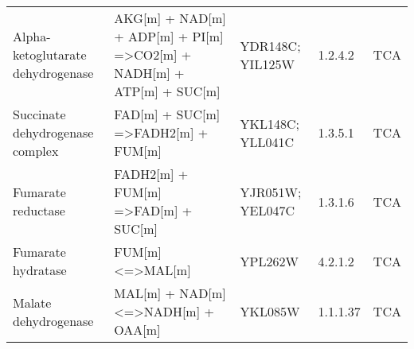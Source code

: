 {\begin{landscape}
\begin{longtable}{p{.25\linewidth} | p{.40\linewidth} | p{.19\linewidth} | p{.05\linewidth} | p{.10\linewidth}}
Alpha-ketoglutarate dehydrogenase                                                         & AKG{[}m{]} + NAD{[}m{]} + ADP{[}m{]} + PI{[}m{]} =\textgreater CO2{[}m{]} + NADH{[}m{]} + ATP{[}m{]} + SUC{[}m{]}                               & YDR148C; YIL125W                                                                                                                                                 & 1.2.4.2            & TCA                                                                         \\
Succinate dehydrogenase complex                                                           & FAD{[}m{]} + SUC{[}m{]} =\textgreater FADH2{[}m{]} + FUM{[}m{]}                                                                                 & YKL148C; YLL041C                                                                                                                                                 & 1.3.5.1            & TCA                                                                         \\
Fumarate reductase                                                                        & FADH2{[}m{]} + FUM{[}m{]} =\textgreater FAD{[}m{]} + SUC{[}m{]}                                                                                 & YJR051W; YEL047C                                                                                                                                                 & 1.3.1.6            & TCA                                                                         \\
Fumarate hydratase                                                                        & FUM{[}m{]} \textless{}=\textgreater MAL{[}m{]}                                                                                                  & YPL262W                                                                                                                                                          & 4.2.1.2            & TCA                                                                         \\
Malate dehydrogenase                                                                      & MAL{[}m{]} + NAD{[}m{]} \textless{}=\textgreater NADH{[}m{]} + OAA{[}m{]}                                                                       & YKL085W                                                                                                                                                          & 1.1.1.37           & TCA                                                                         \\

\end{longtable}
\end{landscape}}
